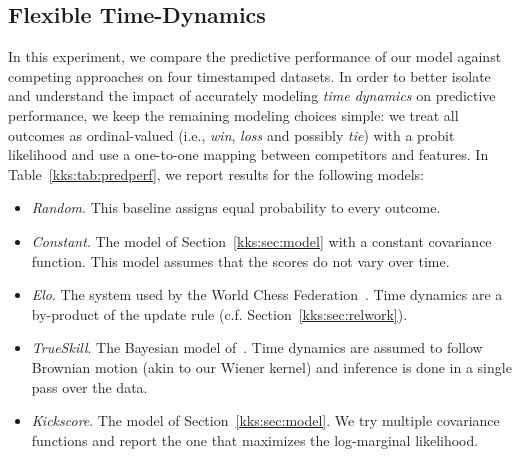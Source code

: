 \subsection{Flexible Time-Dynamics}
\label{kks:sec:evaldyn}

In this experiment, we compare the predictive performance of our model against competing approaches on four timestamped datasets.
In order to better isolate and understand the impact of accurately modeling \emph{time dynamics} on predictive performance, we keep the remaining modeling choices simple: we treat all outcomes as ordinal-valued (i.e., \emph{win}, \emph{loss} and possibly \emph{tie}) with a probit likelihood and use a one-to-one mapping between competitors and features.
In Table~\ref{kks:tab:predperf}, we report results for the following models:
\begin{itemize}
	\item \emph{Random}. This baseline assigns equal probability to every outcome.

	\item \emph{Constant}. The model of Section~\ref{kks:sec:model} with a constant covariance function.
	      This model assumes that the scores do not vary over time.

	\item \emph{Elo}. The system used by the World Chess Federation~\citep{elo1978rating}.
	      Time dynamics are a by-product of the update rule (c.f. Section~\ref{kks:sec:relwork}).

	\item \emph{TrueSkill}. The Bayesian model of~\citet{herbrich2006trueskill}.
	      Time dynamics are assumed to follow Brownian motion (akin to our Wiener kernel) and inference is done in a single pass over the data.

	\item \emph{Kickscore}. The model of Section~\ref{kks:sec:model}.
	      We try multiple covariance functions and report the one that maximizes the log-marginal likelihood.
\end{itemize}

